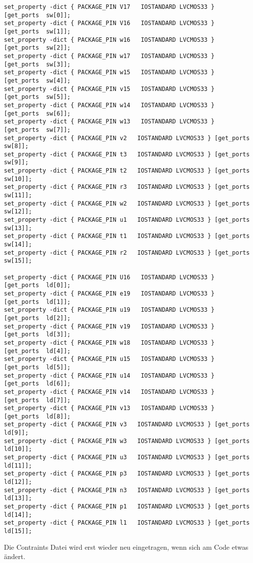\documentclass{article}
\begin{document}
\begin{verbatim}
set_property -dict { PACKAGE_PIN V17   IOSTANDARD LVCMOS33 } [get_ports  sw[0]];
set_property -dict { PACKAGE_PIN V16   IOSTANDARD LVCMOS33 } [get_ports  sw[1]];
set_property -dict { PACKAGE_PIN w16   IOSTANDARD LVCMOS33 } [get_ports  sw[2]];
set_property -dict { PACKAGE_PIN w17   IOSTANDARD LVCMOS33 } [get_ports  sw[3]];
set_property -dict { PACKAGE_PIN w15   IOSTANDARD LVCMOS33 } [get_ports  sw[4]];
set_property -dict { PACKAGE_PIN v15   IOSTANDARD LVCMOS33 } [get_ports  sw[5]];
set_property -dict { PACKAGE_PIN w14   IOSTANDARD LVCMOS33 } [get_ports  sw[6]];
set_property -dict { PACKAGE_PIN w13   IOSTANDARD LVCMOS33 } [get_ports  sw[7]];
set_property -dict { PACKAGE_PIN v2   IOSTANDARD LVCMOS33 } [get_ports  sw[8]];
set_property -dict { PACKAGE_PIN t3   IOSTANDARD LVCMOS33 } [get_ports  sw[9]];
set_property -dict { PACKAGE_PIN t2   IOSTANDARD LVCMOS33 } [get_ports  sw[10]];
set_property -dict { PACKAGE_PIN r3   IOSTANDARD LVCMOS33 } [get_ports  sw[11]];
set_property -dict { PACKAGE_PIN w2   IOSTANDARD LVCMOS33 } [get_ports  sw[12]];
set_property -dict { PACKAGE_PIN u1   IOSTANDARD LVCMOS33 } [get_ports  sw[13]];
set_property -dict { PACKAGE_PIN t1   IOSTANDARD LVCMOS33 } [get_ports  sw[14]];
set_property -dict { PACKAGE_PIN r2   IOSTANDARD LVCMOS33 } [get_ports  sw[15]];

set_property -dict { PACKAGE_PIN U16   IOSTANDARD LVCMOS33 } [get_ports  ld[0]];
set_property -dict { PACKAGE_PIN e19   IOSTANDARD LVCMOS33 } [get_ports  ld[1]];
set_property -dict { PACKAGE_PIN u19   IOSTANDARD LVCMOS33 } [get_ports  ld[2]];
set_property -dict { PACKAGE_PIN v19   IOSTANDARD LVCMOS33 } [get_ports  ld[3]];
set_property -dict { PACKAGE_PIN w18   IOSTANDARD LVCMOS33 } [get_ports  ld[4]];
set_property -dict { PACKAGE_PIN u15   IOSTANDARD LVCMOS33 } [get_ports  ld[5]];
set_property -dict { PACKAGE_PIN u14   IOSTANDARD LVCMOS33 } [get_ports  ld[6]];
set_property -dict { PACKAGE_PIN v14   IOSTANDARD LVCMOS33 } [get_ports  ld[7]];
set_property -dict { PACKAGE_PIN v13   IOSTANDARD LVCMOS33 } [get_ports  ld[8]];
set_property -dict { PACKAGE_PIN v3   IOSTANDARD LVCMOS33 } [get_ports  ld[9]];
set_property -dict { PACKAGE_PIN w3   IOSTANDARD LVCMOS33 } [get_ports  ld[10]];
set_property -dict { PACKAGE_PIN u3   IOSTANDARD LVCMOS33 } [get_ports  ld[11]];
set_property -dict { PACKAGE_PIN p3   IOSTANDARD LVCMOS33 } [get_ports  ld[12]];
set_property -dict { PACKAGE_PIN n3   IOSTANDARD LVCMOS33 } [get_ports  ld[13]];
set_property -dict { PACKAGE_PIN p1   IOSTANDARD LVCMOS33 } [get_ports  ld[14]];
set_property -dict { PACKAGE_PIN l1   IOSTANDARD LVCMOS33 } [get_ports  ld[15]];
\end{verbatim}
Die Contraints Datei wird erst wieder neu eingetragen, wenn sich am Code etwas \"andert.
\end{document}
